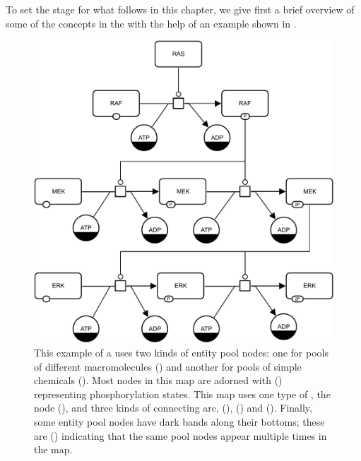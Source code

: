 
To set the stage for what follows in this chapter, we give first a brief overview of some of the concepts in the \PDl with the help of an example shown in .

\begin{figure}[H]
  \centering
  \includegraphics[scale=0.7]{examples/MAPK-only}
  \caption{This example of a \PD {} uses two kinds of entity pool nodes: one
    for pools of different macromolecules () and
    another for pools of simple chemicals ().  Most
     nodes in this map are adorned with  () representing phosphorylation states.
    This map uses one type of , the  node
    (), and three kinds of connecting arc,  (),  () and 
    ().  Finally, some entity pool nodes have dark bands
    along their bottoms; these are  () indicating that the same
    pool nodes appear multiple times in the map.}
  \label{fig:eg1}
\end{figure}

